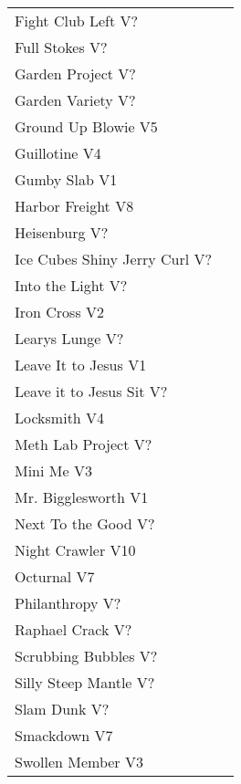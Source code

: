 \begin{center}
\begin{supertabular}{lr}
Fight Club Left V? & \pageref{rt:Fight Club Left} \\
Full Stokes V? & \pageref{rt:Full Stokes} \\
Garden Project V? & \pageref{rt:Garden Project} \\
Garden Variety V? & \pageref{rt:Garden Variety} \\
Ground Up Blowie V5 & \pageref{rt:Ground Up Blowie} \\
Guillotine V4 & \pageref{rt:Guillotine} \\
Gumby Slab V1 & \pageref{rt:Gumby Slab} \\
Harbor Freight V8 & \pageref{vr:Harbor Freight} \\
Heisenburg V? & \pageref{rt:Heisenburg} \\
Ice Cubes Shiny Jerry Curl V? & \pageref{rt:Ice Cubes Shiny Jerry Curl} \\
Into the Light V? & \pageref{rt:Into the Light} \\
Iron Cross V2 & \pageref{vr:Iron Cross} \\
Learys Lunge V? & \pageref{rt:Learys Lunge} \\
Leave It to Jesus V1 & \pageref{rt:Leave It to Jesus} \\
Leave it to Jesus Sit V? & \pageref{vr:Leave it to Jesus Sit} \\
Locksmith V4 & \pageref{rt:Locksmith} \\
Meth Lab Project V? & \pageref{rt:Meth Lab Project} \\
Mini Me V3 & \pageref{rt:Mini Me} \\
Mr. Bigglesworth V1 & \pageref{vr:Mr. Bigglesworth} \\
Next To the Good V? & \pageref{rt:Next To the Good} \\
Night Crawler V10 & \pageref{rt:Night Crawler} \\
Octurnal V7 & \pageref{rt:Octurnal} \\
Philanthropy V? & \pageref{rt:Philanthropy} \\
Raphael Crack V? & \pageref{rt:Raphael Crack} \\
Scrubbing Bubbles V? & \pageref{rt:Scrubbing Bubbles} \\
Silly Steep Mantle V? & \pageref{rt:Silly Steep Mantle} \\
Slam Dunk V? & \pageref{rt:Slam Dunk} \\
Smackdown V7 & \pageref{rt:Smackdown} \\
Swollen Member V3 & \pageref{rt:Swollen Member} \\

\end{supertabular}
\end{center}
